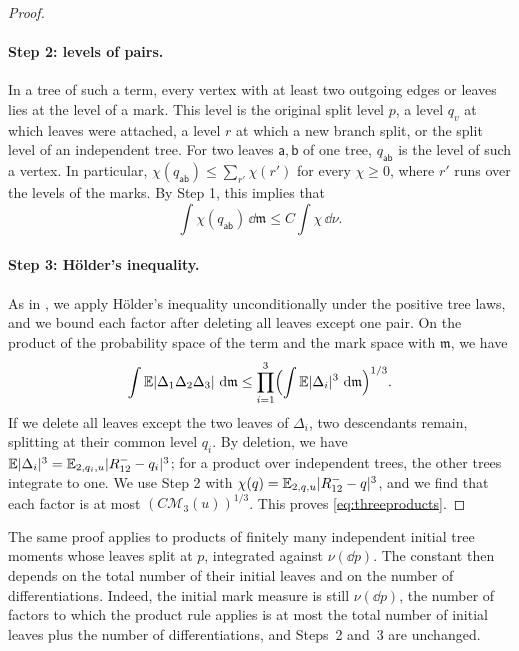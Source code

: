\begin{proof}
\paragraph{Step 2: levels of pairs.}
In a tree of such a term, every vertex with at least two outgoing edges or
leaves lies at the level of a mark. This level is the original split
level $p$, a level $q_v$ at which leaves were attached, a level $r$ at
which a new branch split, or the split level of an independent tree. For
two leaves $\mathsf a,\mathsf b$ of one tree, $q_{\mathsf{ab}}$ is the
level of such a vertex. In particular,
$\chi(q_{\mathsf{ab}})\le\sum_{r'}\chi(r')$ for every $\chi\ge0$, where
$r'$ runs over the levels of the marks. By Step 1, this implies that
\[
 \int\chi(q_{\mathsf{ab}})\,\dd\mathfrak m\le C\int\chi\,\dd\nu .
\]

\paragraph{Step 3: Hölder's inequality.}
As in \cite[Remark~2.4]{OpenAIFluctuationScale}, we apply Hölder's
inequality unconditionally under the positive tree laws, and we bound each
factor after deleting all leaves except one pair. On the product of the
probability space of the term and the mark space with $\mathfrak m$, we
have
\[
 \int\mathbb E|\Delta_1\Delta_2\Delta_3|\,\,\mathrm d\mathfrak m
 \le\prod_{i=1}^3\Bigl(\int\mathbb E|\Delta_i|^3\,\,\mathrm d\mathfrak m\Bigr)^{1/3}.
\]
If we delete all leaves except the two leaves of $\Delta_i$, two
descendants remain, splitting at their common level $q_i$. By deletion, we
have $\mathbb E|\Delta_i|^3=\mathbb E_{2,q_i,u}|R^-_{12}-q_i|^3$; for a product over
independent trees, the other trees integrate to one. We use Step 2 with
$\chi(q)=\mathbb E_{2,q,u}|R^-_{12}-q|^3$, and we find that each factor is at
most $(C\mathcal M_3(u))^{1/3}$. This proves \eqref{eq:threeproducts}.
\end{proof}

The same proof applies to products of finitely many independent initial
tree moments whose leaves split at $p$, integrated against $\nu(\dd p)$.
The constant then depends on the total number of their initial leaves and on the
number of differentiations. Indeed, the initial mark measure is still
$\nu(\dd p)$, the number of factors to which the product rule applies
is at most the total number of initial leaves plus the number of differentiations,
and Steps~2 and~3 are unchanged.

